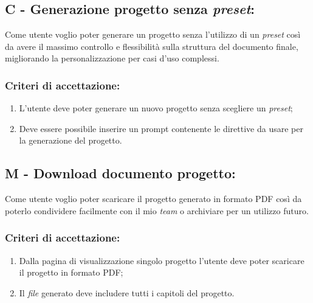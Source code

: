 \vspace{0.5cm}

\subsection*{C - Generazione progetto senza \textit{preset}:}

\noindent Come utente voglio poter generare un progetto senza l’utilizzo di un \textit{preset} così da avere il massimo controllo e flessibilità sulla struttura del documento finale, migliorando la personalizzazione per casi d'uso complessi. 

\subsubsection*{Criteri di accettazione:}

\begin{enumerate}
    \item L'utente deve poter generare un nuovo progetto senza scegliere un \textit{preset};
    \item Deve essere possibile inserire un prompt contenente le direttive da usare per la generazione del progetto.
\end{enumerate}

\vspace{0.5cm}

\subsection*{M - Download documento progetto:}

\noindent Come utente voglio poter scaricare il progetto generato in formato PDF così da poterlo condividere facilmente con il mio \textit{team} o archiviare per un utilizzo futuro.

\subsubsection*{Criteri di accettazione:}

\begin{enumerate}
    \item Dalla pagina di visualizzazione singolo progetto l'utente deve poter scaricare il progetto in formato PDF;
    \item Il \textit{file} generato deve includere tutti i capitoli del progetto.
\end{enumerate}

\vspace{0.5cm}

